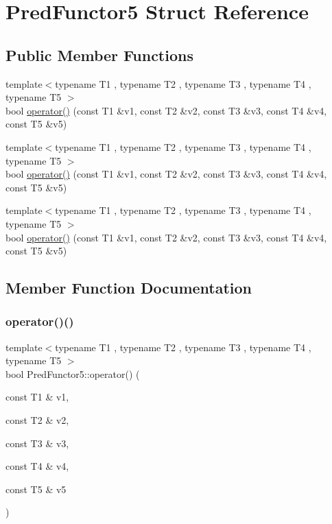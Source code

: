 \hypertarget{struct_pred_functor5}{}\section{Pred\+Functor5 Struct Reference}
\label{struct_pred_functor5}
\subsection*{Public Member Functions}
\begin{DoxyCompactItemize}
\item 
{\footnotesize template$<$typename T1 , typename T2 , typename T3 , typename T4 , typename T5 $>$ }\\bool \mbox{\hyperlink{struct_pred_functor5_af9decf4d509848479ccdc4fe90129a06}{operator()}} (const T1 \&v1, const T2 \&v2, const T3 \&v3, const T4 \&v4, const T5 \&v5)
\item 
{\footnotesize template$<$typename T1 , typename T2 , typename T3 , typename T4 , typename T5 $>$ }\\bool \mbox{\hyperlink{struct_pred_functor5_af9decf4d509848479ccdc4fe90129a06}{operator()}} (const T1 \&v1, const T2 \&v2, const T3 \&v3, const T4 \&v4, const T5 \&v5)
\item 
{\footnotesize template$<$typename T1 , typename T2 , typename T3 , typename T4 , typename T5 $>$ }\\bool \mbox{\hyperlink{struct_pred_functor5_af9decf4d509848479ccdc4fe90129a06}{operator()}} (const T1 \&v1, const T2 \&v2, const T3 \&v3, const T4 \&v4, const T5 \&v5)
\end{DoxyCompactItemize}


\subsection{Member Function Documentation}
\mbox{\label{struct_pred_functor5_af9decf4d509848479ccdc4fe90129a06}} 
\subsubsection{\texorpdfstring{operator()()}{operator()()}\hspace{0.1cm}{\footnotesize\ttfamily [1/3]}}
{\footnotesize\ttfamily template$<$typename T1 , typename T2 , typename T3 , typename T4 , typename T5 $>$ \\
bool Pred\+Functor5\+::operator() (\begin{DoxyParamCaption}\item[{const T1 \&}]{v1,  }\item[{const T2 \&}]{v2,  }\item[{const T3 \&}]{v3,  }\item[{const T4 \&}]{v4,  }\item[{const T5 \&}]{v5 }\end{DoxyParamCaption})\hspace{0.3cm}{\ttfamily [inline]}}

